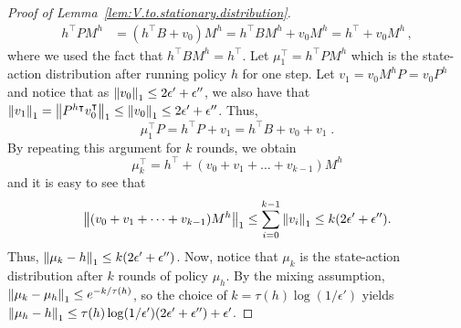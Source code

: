 \documentclass[11pt]{article}
\newcounter{assumption}%
\begin{document}
\begin{proof}[Proof of Lemma~\ref{lem:V.to.stationary.distribution}]
\begin{align*}
h^\top P M^{h} &= (h^\top B + v_0) M^{h} = h^\top B M^{h} + v_0 M^{h}= h^\top + v_0 M^{h} \,,
 \end{align*}
where we used the fact that $h^\top B M^{h} = h^\top$. Let $\mu_1^\top = h^\top P M^{h}$ which is the state-action distribution after running policy $h$ for one step. Let $v_1 = v_0 M^{h} P = v_0 P^{h}$ and notice that as $\left\Vert v_0\right\Vert_1\le 2\epsilon'+\epsilon''$, we also have that $\left\Vert v_1\right\Vert_1 = \left\Vert P^{h \intercal} v_0^\intercal\right\Vert_1 \le \left\Vert v_0\right\Vert_1\le 2\epsilon'+\epsilon''$. Thus,
\[
\mu_1^\top P = h^\top P + v_1 =  h^\top B + v_0 + v_1  \; .
\]
By repeating this argument for $k$ rounds, we obtain
\[
\mu_k^\top = h^\top + (v_0 + v_1 + \dots + v_{k-1}) M^{h}
\]
and it is easy to see that
\[\left\Vert(v_0 + v_1 + \dots + v_{k-1}) M^{h}\right\Vert_1 \le \sum_{i=0}^{k-1} \left\Vert v_i\right\Vert_1 \le k( 2\epsilon'+\epsilon'').
\] Thus, $\left\Vert\mu_k - h\right\Vert_1 \le k (2 \epsilon'+\epsilon'')$. Now, notice that $\mu_k$ is the state-action distribution after $k$ rounds of policy $ \mu_{h}$. By the mixing assumption, $\left\Vert\mu_k -  \mu_{h}\right\Vert_1 \le e^{-k/\tau(h)}$, so the choice of $k=\tau(h) \log (1/\epsilon')$ yields $\left\Vert \mu_{h} - h\right\Vert_1 \le \tau(h) \log(1/\epsilon') (2\epsilon'+\epsilon'') + \epsilon'$.

\end{proof}
\end{document}
